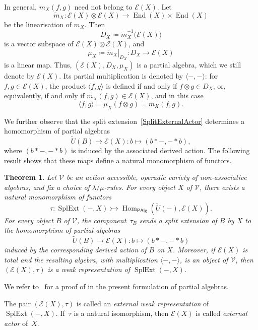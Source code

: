 \documentclass[reqno,a4paper]{amsart}
\theoremstyle{plain}
\newtheorem{theorem}[subsection]{Theorem}
\theoremstyle{definition}
\theoremstyle{remark}
\numberwithin{equation}{section}
\newcommand{\E}{\mathcal{E}}
\newcommand{\V}{\mathcal{V}}
\DeclareMathOperator{\Hom}{Hom}
\DeclareMathOperator{\SplExt}{SplExt}
\DeclareMathOperator{\End}{End}
\newcommand{\PAlg}{\ensuremath{\mathsf{PAlg}}}
\begin{document}
In general, $m_X(f,g)$ need not belong to $\E(X)$. Let
\[
\widetilde m_X\colon\E(X)\otimes\E(X)\to\End(X)\times\End(X)
\]
be the linearisation of $m_X$. Then
\[
D_X\coloneqq\widetilde m_X^{-1}\bigl(\E(X)\bigr)
\]
is a vector subspace of $\E(X)\otimes\E(X)$, and
\[
\mu_X\coloneqq\left.\widetilde m_X\right|_{D_X}\colon D_X\to\E(X)
\]
is a linear map. Thus, $(\E(X),D_X,\mu_X)$ is a partial algebra, which we still denote by $\E(X)$. Its partial multiplication is denoted by $\langle-,-\rangle$: for $f,g\in\E(X)$, the product $\langle f,g\rangle$ is defined if and only if $f\otimes g\in D_X$, or, equivalently, if and only if $m_X(f,g)\in\E(X)$, and in this case
\[
\langle f,g\rangle=\mu_X(f\otimes g)=m_X(f,g).
\]

We further observe that the split extension~\eqref{SplitExternalActor} determines a homomorphism of partial algebras
\[
\widetilde U(B)\to\E(X)\colon b\mapsto(b\ast-,-\ast b),
\]
where $(b\ast-,-\ast b)$ is induced by the associated derived action. The following result shows that these maps define a natural monomorphism of functors.

\begin{theorem}\cite{WRAAlg,SurveyActions}\label{ThmExternalActorOneOperation}
Let $\V$ be an action accessible, operadic variety of non-associative algebras, and fix a choice of $\lambda/\mu$-rules. For every object $X$ of $\V$, there exists a natural monomorphism of functors
\[
\tau\colon\SplExt(-,X)\rightarrowtail\Hom_{\PAlg}(\widetilde U(-),\E(X)).
\]
For every object $B$ of $\V$, the component~$\tau_B$ sends a split extension of $B$ by $X$ to the homomorphism of partial algebras
\[
\widetilde U(B)\to\E(X)\colon b\mapsto(b\ast-,-\ast b)
\]
induced by the corresponding derived action of $B$ on $X$. Moreover, if $\E(X)$ is total and the resulting algebra, with multiplication $\langle-,-\rangle$, is an object of $\V$, then $(\E(X),\tau)$ is a weak representation of $\SplExt(-,X)$.
\end{theorem}

We refer to~\cite[Theorem~5.14]{SurveyActions} for a proof of  in the present formulation of partial algebras.

The pair $(\E(X),\tau)$ is called an \emph{external weak representation} of $\SplExt(-,X)$. If~$\tau$ is a natural isomorphism, then $\E(X)$ is called \emph{external actor} of~$X$.
\end{document}
